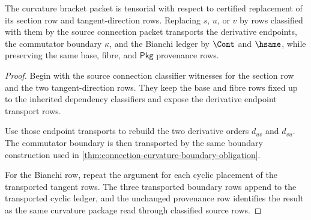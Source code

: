 \begin{theorem}
\label{thm:curvature-tensorial-transport-obligation}
The curvature bracket packet is tensorial with respect to certified replacement of its section row and tangent-direction rows. Replacing $s$, $u$, or $v$ by rows classified with them by the source connection packet transports the derivative endpoints, the commutator boundary $\kappa$, and the Bianchi ledger by $\Cont$ and $\hsame$, while preserving the same base, fibre, and $\mathsf{Pkg}$ provenance rows.
\end{theorem}
\begin{proof}
Begin with the source connection classifier witnesses for the section row and the two tangent-direction rows. They keep the base and fibre rows fixed up to the inherited dependency classifiers and expose the derivative endpoint transport rows.

Use those endpoint transports to rebuild the two derivative orders $d_{uv}$ and $d_{vu}$. The commutator boundary is then transported by the same boundary construction used in \autoref{thm:connection-curvature-boundary-obligation}.

For the Bianchi row, repeat the argument for each cyclic placement of the transported tangent rows. The three transported boundary rows append to the transported cyclic ledger, and the unchanged provenance row identifies the result as the same curvature package read through classified source rows.
\end{proof}

